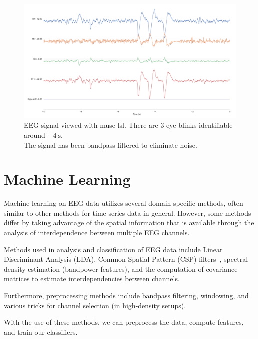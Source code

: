     \begin{landscape}
        \begin{figure}
            \begin{center}
                \includegraphics[trim=60 50 50 60,clip,width=22cm]{img/muselsl-signal.png}
            \end{center}
            \caption{EEG signal viewed with muse-lsl. There are 3 eye blinks identifiable around $\SI{-4}{\second}$.\\ The signal has been bandpass filtered to eliminate noise.}\label{fig:muselsl-signal}
        \end{figure}
    \end{landscape}

\section{Machine Learning}

    Machine learning on EEG data utilizes several domain-specific methods, often similar to other methods for time-series data in general. However, some methods differ by taking advantage of the spatial information that is available through the analysis of interdependence between multiple EEG channels.

    Methods used in analysis and classification of EEG data include Linear Discriminant Analysis (LDA), Common Spatial Pattern (CSP) filters~\cite{barachant_common_2010}, spectral density estimation (bandpower features), and the computation of covariance matrices to estimate interdependencies between channels. 

    Furthermore, preprocessing methods include bandpass filtering, windowing, and various tricks for channel selection (in high-density setups). 

    With the use of these methods, we can preprocess the data, compute features, and train our classifiers.

